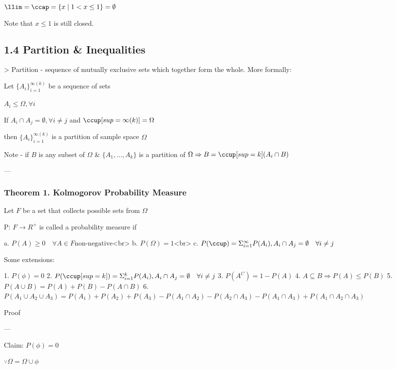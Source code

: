 \documentclass[12 pt]{article}
\begin{document}
\(\llim = \ccap = \{x \mid 1 < x \le 1\} = \emptyset\)

Note that \(x \le 1\) is still closed.


\subsection{1.4 Partition \& Inequalities}

> Partition - sequence of mutually exclusive sets which together form the whole. More formally:

Let \(\{A_i\}_{i = 1}^{\infty (k)}\) be a sequence of sets

\(A_i \le \Omega, \forall i\)

If \(A_i \cap A_j = \emptyset, \forall i \ne j\) and \(\ccup[sup=\infty (k)] = \Omega\)

then \(\{A_i\}_{i=1}^{\infty (k)}\) is a partition of sample space \(\Omega\)

Note - if \(B\) is any subset of \(\Omega\) \& \(\{A_1, ..., A_k\}\) is a partition of \(\Omega \Rightarrow B = \ccup[sup=k] (A_i \cap B)\)

---

\subsubsection{Theorem 1. Kolmogorov Probability Measure}

Let \(F\) be a set that collects possible sets from \(\Omega\)

P: \(F \rightarrow R^+\) is called a probability measure if

a. \(P(A) \ge 0 \quad \forall A \in F \text{non-negative}\)<br>
b. \(P(\Omega) = 1\)<br>
c. \(P(\ccup) = \Sigma_{i=1}^{\infty} P(A_i), A_i \cap A_j = \emptyset \quad \forall i \ne j\)

Some extensions:

1. \(P(\phi) = 0\)
2. \(P(\ccup[sup=k]) = \Sigma_{i=1}^{k} P(A_i), A_i \cap A_j = \emptyset \quad \forall i \ne j\)
3. \(P(A^C) = 1 - P(A)\)
4. \(A \subseteq B \Rightarrow P(A) \le P(B)\)
5. \(P(A \cup B) = P(A) + P(B) - P(A \cap B)\)
6. \(P(A_1 \cup A_2 \cup A_3) = P(A_1) + P(A_2) + P(A_3) - P(A_1 \cap A_2) - P(A_2 \cap A_3) - P(A_1 \cap A_3) + P(A_1 \cap A_2 \cap A_3)\)

Proof

---

Claim: \(P(\phi) = 0\)

\(\because \Omega = \Omega \cup \phi\)
\end{document}
